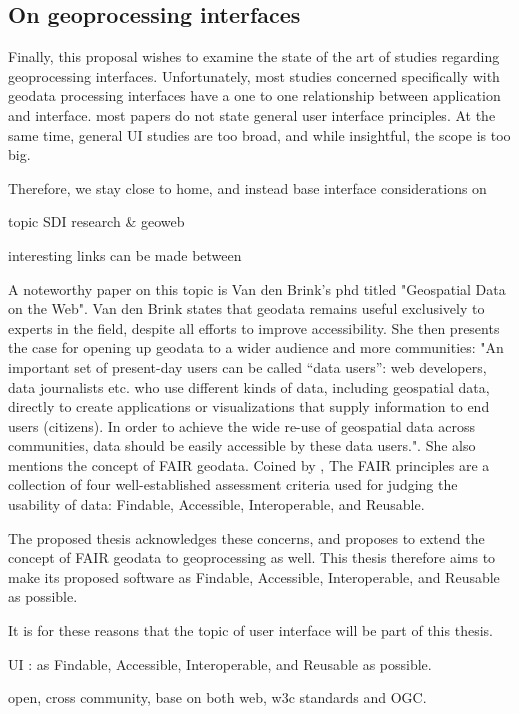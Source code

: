 \subsection{On geoprocessing interfaces}

Finally, this proposal wishes to examine the state of the art of studies regarding geoprocessing interfaces. Unfortunately, most studies concerned specifically with geodata processing interfaces have a one to one relationship between application and interface. most papers do not state general user interface principles. At the same time, general UI studies are too broad, and while insightful, the scope is too big. 

Therefore, we stay close to home, and instead base interface considerations on

topic SDI research \& geoweb

interesting links can be made between

A noteworthy paper on this topic is Van den Brink's phd titled "Geospatial Data on the Web". Van den Brink states that geodata remains useful exclusively to experts in the field, despite all efforts to improve accessibility. 
She then presents the case for opening up geodata to a wider audience and more communities: "An important set of present-day users can be called “data users”: web developers, data journalists etc. who use different kinds of data, including geospatial data, directly to create applications or visualizations that supply information to end users (citizens). In order to achieve the wide re-use of geospatial data across communities, data should be easily accessible by these data users.". She also mentions the concept of FAIR geodata. Coined by \cite{mark_d_wilkinson_fair_2016}, The FAIR principles are a collection of four well-established assessment criteria used for judging the usability of data: Findable, Accessible, Interoperable, and Reusable. 

The proposed thesis acknowledges these concerns, and proposes to extend the concept of FAIR geodata to geoprocessing as well. This thesis therefore aims to make its proposed software as Findable, Accessible, Interoperable, and Reusable as possible. 

It is for these reasons that the topic of user interface will be part of this thesis. 

UI : as Findable, Accessible, Interoperable, and Reusable as possible. 

open, cross community, base on both web, w3c standards and OGC.

